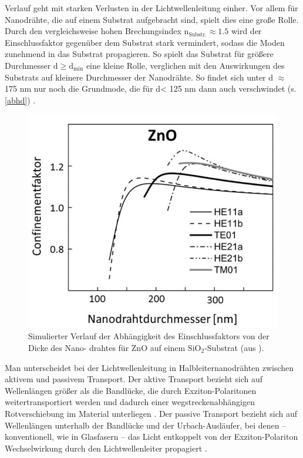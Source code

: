 Verlauf geht mit starken Verlusten in der Lichtwellenleitung einher. Vor allem
für Nanodrähte, die auf einem Substrat aufgebracht sind, spielt dies eine große
Rolle. Durch den vergleichsweise hohen Brechungsindex $\text{n}_\text{Substr.}
\approx 1.5$ wird der Einschlussfaktor gegenüber dem Substrat stark vermindert,
sodass die Moden zunehmend in das Substrat propagieren. So spielt das Substrat
für größere Durchmesser $\text{d} \geq \text{d}_\text{min}$ eine kleine Rolle,
verglichen mit den Auswirkungen des Substrats auf kleinere Durchmesser der
Nanodrähte. So findet sich unter d $\approx$ 175 nm nur noch die Grundmode, die
für d< 125 nm dann auch verschwindet (s. \autoref{abhd}) \cite{Roeder.Diss}.\\
\begin{figure}[b] \centering
\includegraphics[width=.35\textwidth]{Bilder/Vorbetrachtung/abhd}
\caption[Abhängigkeit des Einschlussfaktors von der Nanodrahtdicke]{Simulierter
Verlauf der Abhängigkeit des Einschlussfaktors von der Dicke des Nano- drahtes
für ZnO auf einem $\text{SiO}_\text{2}$-Substrat (aus \cite{Zimmler.2010}).}
\label{abhd} \end{figure}Man unterscheidet bei der Lichtwellenleitung in
Halbleiternanodrähten zwischen aktivem und passivem Transport. Der aktive
Transport bezieht sich auf Wellenlängen größer als die Bandlücke, die durch
Exziton-Polaritonen weitertransportiert werden und dadurch einer
wegstreckenabhängigen Rotverschiebung im Material unterliegen  \cite{Pan.2005}.
Der passive Transport bezieht sich auf Wellenlängen unterhalb der Bandlücke und
der Urbach-Ausläufer, bei denen – konventionell, wie in Glasfasern – das Licht
entkoppelt von der Exziton-Polariton Wechselwirkung durch den Lichtwellenleiter
propagiert \cite{Klingshirn.2007}.

